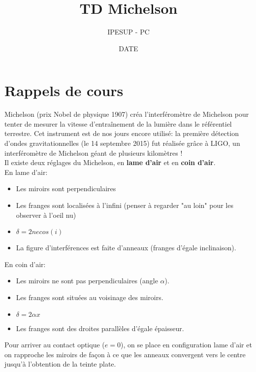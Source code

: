 \documentclass{article}
\title{TD Michelson }
\author{IPESUP - PC }
\date{DATE}
\begin{document}
\maketitle

\section{Rappels de cours}
Michelson (prix Nobel de physique 1907) créa l'interféromètre de Michelson pour tenter de mesurer la vitesse d'entraînement de la lumière dans le référentiel terrestre. 
Cet instrument est de nos jours encore utilisé: la première détection d'ondes gravitationnelles (le 14 septembre 2015) fut réalisée grâce à LIGO, un interféromètre de Michelson géant de plusieurs kilomètres ! \\
Il existe deux réglages du Michelson, en \textbf{lame d'air} et en \textbf{coin d'air}.\\ 
En lame d'air: \\
\begin{itemize}
  \item Les miroirs sont perpendiculaires
  \item Les franges sont localisées à l'infini (penser à regarder "au loin" pour les observer à l'oeil nu)
  \item $\delta = 2ne cos(i)$ 
  \item La figure d'interférences est faite d'anneaux (franges d'égale inclinaison). \\

\end{itemize}

En coin d'air: \\
\begin{itemize}
  \item Les miroirs ne sont pas perpendiculaires (angle $\alpha$). 
  \item Les franges sont situées au voisinage des miroirs. 
  \item $\delta = 2 \alpha x $
  \item Les franges sont des droites parallèles d'égale épaisseur. \\
\end{itemize}

Pour arriver au contact optique ($e=0$), on se place en configuration lame d'air et on rapproche les miroirs de façon à ce que les anneaux convergent vers le centre jusqu'à l'obtention de la teinte plate. 
\end{document}
